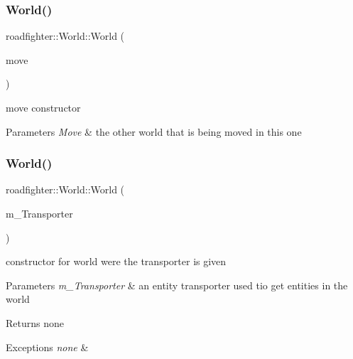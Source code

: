 \subsubsection{\texorpdfstring{World()}{World()}\hspace{0.1cm}{\footnotesize\ttfamily [3/4]}}
{\footnotesize\ttfamily roadfighter\+::\+World\+::\+World (\begin{DoxyParamCaption}\item[{\hyperlink{classroadfighter_1_1World}{World} \&\&}]{move }\end{DoxyParamCaption})\hspace{0.3cm}{\ttfamily [default]}}

move constructor 
\begin{DoxyParams}{Parameters}
{\em Move} & the other world that is being moved in this one \\
\hline
\end{DoxyParams}
\mbox{\label{classroadfighter_1_1World_ad1c38e0c158813af36113953003362d1}} 
\subsubsection{\texorpdfstring{World()}{World()}\hspace{0.1cm}{\footnotesize\ttfamily [4/4]}}
{\footnotesize\ttfamily roadfighter\+::\+World\+::\+World (\begin{DoxyParamCaption}\item[{const std\+::shared\+\_\+ptr$<$ \hyperlink{classroadfighter_1_1EntityTransporter}{roadfighter\+::\+Entity\+Transporter} $>$ \&}]{m\+\_\+\+Transporter }\end{DoxyParamCaption})\hspace{0.3cm}{\ttfamily [explicit]}}

constructor for world were the transporter is given 
\begin{DoxyParams}{Parameters}
{\em m\+\_\+\+Transporter} & an entity transporter used tio get entities in the world \\
\hline
\end{DoxyParams}
\begin{DoxyReturn}{Returns}
none 
\end{DoxyReturn}

\begin{DoxyExceptions}{Exceptions}
{\em none} & \\
\hline
\end{DoxyExceptions}
\mbox{\label{classroadfighter_1_1World_aea82fc8fead2cfb0032de65b1a198058}} 
